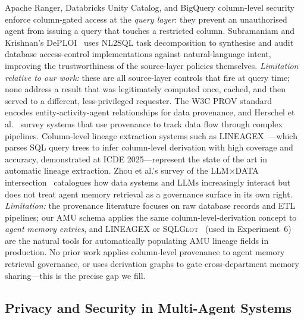 \documentclass[9pt,twocolumn,twoside]{extarticle}
\begin{document}
Apache Ranger, Databricks Unity Catalog, and BigQuery column-level security
enforce column-gated access at the \emph{query layer}: they prevent an
unauthorised agent from issuing a query that touches a restricted column.
Subramaniam and Krishnan's DePLOI~\cite{subramaniam2024deploi} uses NL2SQL
task decomposition to synthesise and audit database access-control
implementations against natural-language intent, improving the
trustworthiness of the source-layer policies themselves.
\emph{Limitation relative to our work:} these are all source-layer controls
that fire at query time; none address a result that was legitimately computed
once, cached, and then served to a different, less-privileged requester.
The W3C PROV standard~\cite{moreau2011prov} encodes entity-activity-agent
relationships for data provenance, and Herschel et al.~\cite{herschel2017survey}
survey systems that use provenance to track data flow through complex
pipelines.
Column-level lineage extraction systems such as
LINEAGEX~\cite{zhang2025lineagex}---which parses SQL query trees to infer
column-level derivation with high coverage and accuracy, demonstrated at ICDE
2025---represent the state of the art in automatic lineage extraction.
Zhou et al.'s survey of the LLM$\times$DATA intersection~\cite{zhou2025llmxdata}
catalogues how data systems and LLMs increasingly interact but does not treat
agent memory retrieval as a governance surface in its own right.
\emph{Limitation:} the provenance literature focuses on raw database records
and ETL pipelines; our AMU schema applies the same column-level-derivation
concept to \emph{agent memory entries}, and LINEAGEX or
\textsc{SQLGlot}~\cite{sqlglot2023} (used in Experiment~6) are the natural
tools for automatically populating AMU lineage fields in production.
No prior work applies column-level provenance to agent memory retrieval
governance, or uses derivation graphs to gate cross-department memory
sharing---this is the precise gap we fill.

\subsection{Privacy and Security in Multi-Agent Systems}
\end{document}
